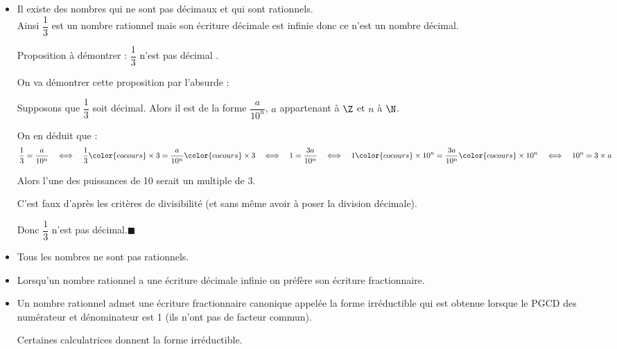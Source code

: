 \begin{rem}{}{}
\begin{itemize}
\item  Il existe des nombres qui ne sont pas décimaux et qui sont rationnels. \\ Ainsi $\dfrac{1}{3}$ est un nombre rationnel mais son écriture décimale est infinie donc ce n'est un nombre décimal.
\begin{deme}{}{}
Proposition à démontrer : \og $\dfrac{1}{3}$ n'est pas décimal \fg.

\medskip
On va démontrer cette proposition par l'absurde :

\noindent Supposons que $\dfrac{1}{3}$ soit décimal. Alors il est de la forme $\dfrac{a}{10^n}$, $a$ appartenant à $\Z$ et $n$ à $\N$.

\noindent On en déduit que : 
\begin{align*}
\dfrac{1}{3} = \dfrac{a}{10^n} \quad \Longleftrightarrow \quad
\dfrac{1}{3} {\color{cocours} \times 3}= \dfrac{a}{10^n}{\color{cocours} \times 3}\quad \Longleftrightarrow \quad
1 = \dfrac{3a}{10^n}\quad \Longleftrightarrow \quad
1 {\color{cocours} \times 10^n}= \dfrac{3a}{10^n}{\color{cocours} \times 10^n}\quad \Longleftrightarrow \quad
10^n = 3 \times a
\end{align*}

\noindent Alors l'une des puissances de 10 serait un multiple de 3. 

\noindent C'est faux d'après les critères de divisibilité (et sans même avoir à poser la division décimale).

\noindent Donc $\dfrac{1}{3}$ n'est pas décimal.\hfill $\blacksquare$
\end{deme}
\item  Tous les nombres ne sont pas rationnels.
\item  Lorsqu'un nombre rationnel a une écriture décimale infinie on préfère son écriture fractionnaire.
\item  Un nombre rationnel admet une écriture fractionnaire canonique appelée la forme irréductible qui est obtenue lorsque le PGCD des numérateur et dénominateur est 1 (ils n'ont pas de facteur commun).
	
Certaines calculatrices donnent la forme irréductible.
\end{itemize}
\end{rem}

